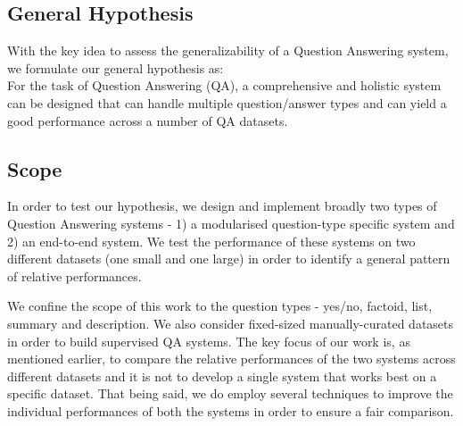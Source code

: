 \subsection{General Hypothesis}

With the key idea to assess the generalizability of a Question Answering system, we formulate our general hypothesis as: \\

For the task of Question Answering (QA), a comprehensive and holistic system can be designed that can handle multiple question/answer types and can yield a good performance across a number of QA datasets.

\subsection{Scope}

In order to test our hypothesis, we design and implement broadly two types of Question Answering systems - 1) a modularised question-type specific system and 2) an end-to-end system. We test the performance of these systems on two different datasets (one small and one large) in order to identify a general pattern of relative performances. 

We confine the scope of this work to the question types - yes/no, factoid, list, summary and description. We also consider fixed-sized manually-curated datasets in order to build supervised QA systems. The key focus of our work is, as mentioned earlier, to compare the relative performances of the two systems across different datasets and it is not to develop a single system that works best on a specific dataset. That being said, we do employ several techniques to improve the individual performances of both the systems in order to ensure a fair comparison.


    

